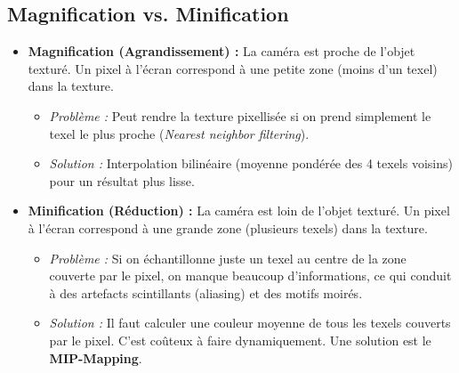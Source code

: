 \documentclass{article}
\begin{document}
\subsection{Magnification vs. Minification}
\begin{itemize}
    \item \textbf{Magnification (Agrandissement) :} La caméra est proche de l'objet texturé. Un pixel à l'écran correspond à une petite zone (moins d'un texel) dans la texture.
        \begin{itemize}
            \item \textit{Problème :} Peut rendre la texture pixellisée si on prend simplement le texel le plus proche (\textit{Nearest neighbor filtering}).
            \item \textit{Solution :} Interpolation bilinéaire (moyenne pondérée des 4 texels voisins) pour un résultat plus lisse.
        \end{itemize}
    \item \textbf{Minification (Réduction) :} La caméra est loin de l'objet texturé. Un pixel à l'écran correspond à une grande zone (plusieurs texels) dans la texture.
        \begin{itemize}
            \item \textit{Problème :} Si on échantillonne juste un texel au centre de la zone couverte par le pixel, on manque beaucoup d'informations, ce qui conduit à des artefacts scintillants (aliasing) et des motifs moirés.
            \item \textit{Solution :} Il faut calculer une couleur moyenne de tous les texels couverts par le pixel. C'est coûteux à faire dynamiquement. Une solution est le \textbf{MIP-Mapping}.
        \end{itemize}
\end{itemize}
\end{document}
